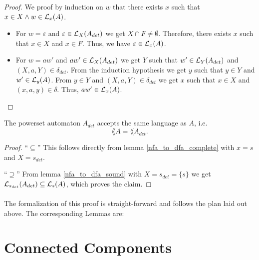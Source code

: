     \begin{proof}
        We proof by induction on $w$ that there exists $x$ such that $x \in X \wedge w \in \mathcal{L}_{x}(A)$. 
        \begin{itemize}
            \item
                For $w = \varepsilon$ and $\varepsilon \in \mathcal{L}_{X}(A_{det})$ we get  $X \cap F \neq \emptyset$.
                Therefore, there exists $x$ such that $x \in X$ and $x \in F$.
                Thus, we have $\varepsilon \in \mathcal{L}_{x}(A)$.
            \item
                For $w = a w'$ and $a w' \in \mathcal{L}_{X}(A_{det})$ we get $Y$ such that $w' \in \mathcal{L}_{Y}(A_{det})$ and $(X,a,Y) \in \delta_{det}$.
                From the induction hypothesis we get $y$ such that $y \in Y$ and $w' \in \mathcal{L}_{y}(A)$.
                From $y \in Y$ and $(X, a, Y) \in \delta_{det}$ we get $x$ such that $x \in X$ and $(x, a, y) \in \delta$.
                Thus, $a w' \in \mathcal{L}_{x}(A)$.
        \end{itemize}
    \end{proof}

    \begin{theorem}
        The powerset automaton $A_{det}$ accepts the same language as $A$, i.e.
        \begin{equation*}        
            \lang{A} = \lang{A_{det}}.        
        \end{equation*}
    \end{theorem}
    \begin{proof}
        ``$\subseteq$'' 
        This follows directly from lemma \ref{nfa_to_dfa_complete} with $x = s$ and $X = {s}_{det}$.

        ``$\supseteq$''
        From lemma \ref{nfa_to_dfa_sound} with $X = {s}_{det} = \{s\}$ we get 
        $\mathcal{L}_{s_{det}}(A_{det}) \subseteq \mathcal{L}_{s}(A)$, which proves the claim.
    \end{proof}

    \paragraph{}
    The formalization of this proof is straight-forward and follows the plan laid out above. 
    The corresponding Lemmas are:


    \section{Connected Components}
